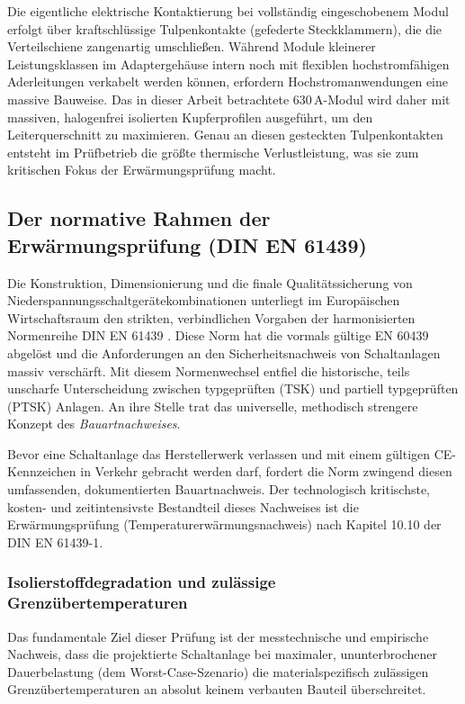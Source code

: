 Die eigentliche elektrische Kontaktierung bei vollständig eingeschobenem Modul erfolgt über kraftschlüssige Tulpenkontakte (gefederte Steckklammern), die die Verteilschiene zangenartig umschließen. Während Module kleinerer Leistungsklassen im Adaptergehäuse intern noch mit flexiblen hochstromfähigen Aderleitungen verkabelt werden können, erfordern Hochstromanwendungen eine massive Bauweise. Das in dieser Arbeit betrachtete $630\,\text{A}$-Modul wird daher mit massiven, halogenfrei isolierten Kupferprofilen ausgeführt, um den Leiterquerschnitt zu maximieren. Genau an diesen gesteckten Tulpenkontakten entsteht im Prüfbetrieb die größte thermische Verlustleistung, was sie zum kritischen Fokus der Erwärmungsprüfung macht.

\subsection{Der normative Rahmen der Erwärmungsprüfung (DIN EN 61439)}
\label{sec:normen_61439}

Die Konstruktion, Dimensionierung und die finale Qualitätssicherung von Niederspannungsschaltgerätekombinationen unterliegt im Europäischen Wirtschaftsraum den strikten, verbindlichen Vorgaben der harmonisierten Normenreihe DIN EN 61439 \cite{ABB_Handbuch}. Diese Norm hat die vormals gültige EN 60439 abgelöst und die Anforderungen an den Sicherheitsnachweis von Schaltanlagen massiv verschärft. Mit diesem Normenwechsel entfiel die historische, teils unscharfe Unterscheidung zwischen typgeprüften (TSK) und partiell typgeprüften (PTSK) Anlagen. An ihre Stelle trat das universelle, methodisch strengere Konzept des \textit{Bauartnachweises}.

Bevor eine Schaltanlage das Herstellerwerk verlassen und mit einem gültigen CE-Kennzeichen in Verkehr gebracht werden darf, fordert die Norm zwingend diesen umfassenden, dokumentierten Bauartnachweis. Der technologisch kritischste, kosten- und zeitintensivste Bestandteil dieses Nachweises ist die Erwärmungsprüfung (Temperaturerwärmungsnachweis) nach Kapitel 10.10 der DIN EN 61439-1.
\subsubsection{Isolierstoffdegradation und zulässige Grenzübertemperaturen}
Das fundamentale Ziel dieser Prüfung ist der messtechnische und empirische Nachweis, dass die projektierte Schaltanlage bei maximaler, ununterbrochener Dauerbelastung (dem Worst-Case-Szenario) die materialspezifisch zulässigen Grenzübertemperaturen an absolut keinem verbauten Bauteil überschreitet.

